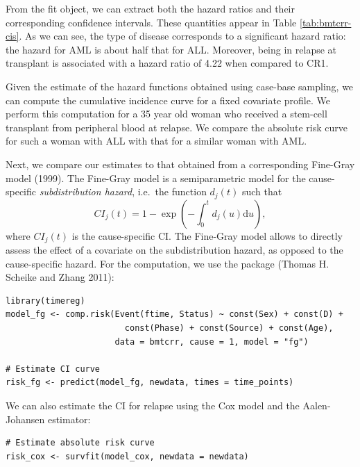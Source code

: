 From the fit object, we can extract both the hazard ratios and their corresponding confidence intervals. These quantities appear in Table \ref{tab:bmtcrr-cis}. As we can see, the type of disease corresponds to a significant hazard ratio: the hazard for AML is about half that for ALL. Moreover, being in relapse at transplant is associated with a hazard ratio of 4.22 when compared to CR1.

Given the estimate of the hazard functions obtained using case-base sampling, we can compute the cumulative incidence curve for a fixed covariate profile. We perform this computation for a 35 year old woman who received a stem-cell transplant from peripheral blood at relapse. We compare the absolute risk curve for such a woman with ALL with that for a similar woman with AML.

Next, we compare our estimates to that obtained from a corresponding Fine-Gray model (1999). The Fine-Gray model is a semiparametric model for the cause-specific \emph{subdistribution hazard}, i.e.~the function \(d_j(t)\) such that
\[CI_j(t) = 1 - \exp\left( - \int_0^t d_j(u) \textrm{d}u \right),\]
where \(CI_j(t)\) is the cause-specific CI. The Fine-Gray model allows to directly assess the effect of a covariate on the subdistribution hazard, as opposed to the cause-specific hazard. For the computation, we use the  package (Thomas H. Scheike and Zhang 2011):

\begin{verbatim}
library(timereg)
model_fg <- comp.risk(Event(ftime, Status) ~ const(Sex) + const(D) +
                        const(Phase) + const(Source) + const(Age),
                      data = bmtcrr, cause = 1, model = "fg")

# Estimate CI curve
risk_fg <- predict(model_fg, newdata, times = time_points)
\end{verbatim}

We can also estimate the CI for relapse using the Cox model and the Aalen-Johansen estimator:

\begin{verbatim}
# Estimate absolute risk curve
risk_cox <- survfit(model_cox, newdata = newdata)
\end{verbatim}

